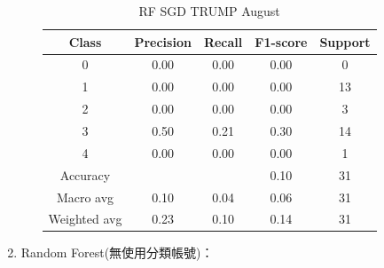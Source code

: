 \begin{enumerate}
\begin{enumerate}
\begin{table}[H]
                \vspace{1em}
                
                \scriptsize
                \begin{tabular}{c|cccc}
                \hline
                Class & Precision & Recall & F1-score & Support \\
                \hline
                0 & 0.00 & 0.00 & 0.00 & 0 \\
                1 & 0.00 & 0.00 & 0.00 & 13 \\
                2 & 0.00 & 0.00 & 0.00 & 3 \\
                3 & 0.50 & 0.21 & 0.30 & 14 \\
                4 & 0.00 & 0.00 & 0.00 & 1 \\
                \hline
                Accuracy &       &      & 0.10 & 31 \\
                Macro avg & 0.10 & 0.04 & 0.06 & 31 \\
                Weighted avg & 0.23 & 0.10 & 0.14 & 31 \\
                \hline
                \end{tabular}
                \caption{RF SGD TRUMP August}
                \label{tab:classifier_2_report_rf_sgd_trump_filtered_aug}
                \end{table}


    
    
                
            \end{enumerate}

        \pagebreak

        \item Random Forest(無使用分類帳號)：


\end{enumerate}
